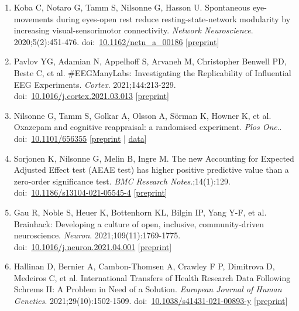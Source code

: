 \documentclass[10pt,a4paper,twocolumn]{article}
\begin{document}
\begin{enumerate}
    \item Koba C, Notaro G, Tamm S, Nilsonne G, Hasson U. Spontaneous eye-movements during eyes-open rest reduce resting-state-network modularity by increasing visual-sensorimotor connectivity. \textit{Network Neuroscience}. 2020;5(2):451-476. doi:~\href{https://doi.org/10.1162/netn_a_00186}{10.1162/netn\_a\_00186} [\href{https://doi.org/10.1101/2020.05.18.100669}{preprint}]

    \item Pavlov YG, Adamian N, Appelhoff S, Arvaneh M, Christopher Benwell PD, Beste C, et al. \#EEGManyLabs: Investigating the Replicability of Influential EEG Experiments. \textit{Cortex}. 2021;144:213-229. doi:~\href{https://doi.org/10.1016/j.cortex.2021.03.013}{10.1016/j.cortex.2021.03.013} [\href{https://doi.org/10.31234/osf.io/528nr}{preprint}]

    \item Nilsonne G, Tamm S, Golkar A, Olsson A, Sörman K, Howner K, et al. Oxazepam and cognitive reappraisal: a randomised experiment. \textit{Plos One}.. doi:~\href{https://doi.org/10.1101/656355}{10.1101/656355} [\href{https://doi.org/10.1101/656355}{preprint} | \href{https://doi.org/10.5281/zenodo.3236076}{data}]

    \item Sorjonen K, Nilsonne G, Melin B, Ingre M. The new Accounting for Expected Adjusted Effect test (AEAE test) has higher positive predictive value than a zero-order significance test. \textit{BMC Research Notes}.;14(1):129. doi:~\href{https://doi.org/10.1186/s13104-021-05545-4}{10.1186/s13104-021-05545-4} [\href{http://doi.org/10.31234/osf.io/fp8g3}{preprint}]

    \item Gau R, Noble S, Heuer K, Bottenhorn KL, Bilgin IP, Yang Y-F, et al. Brainhack: Developing a culture of open, inclusive, community-driven neuroscience. \textit{Neuron}. 2021;109(11):1769-1775. doi:~\href{https://doi.org/10.1016/j.neuron.2021.04.001}{10.1016/j.neuron.2021.04.001} [\href{http://doi.org/10.31234/osf.io/rytjq}{preprint}]

    \item Hallinan D, Bernier A, Cambon-Thomsen A, Crawley F P, Dimitrova D, Medeiros C, et al. International Transfers of Health Research Data Following Schrems II: A Problem in Need of a Solution. \textit{European Journal of Human Genetics}. 2021;29(10):1502-1509. doi:~\href{https://doi.org/10.1038/s41431-021-00893-y}{10.1038/s41431-021-00893-y} [\href{http://doi.org/10.2139/ssrn.3688392}{preprint}]


\end{enumerate}
\end{document}
